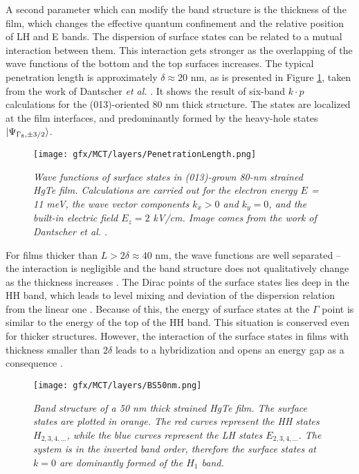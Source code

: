\documentclass[titlepage,a4paper]{book}
\begin{document}
A second parameter which can modify the band structure is the thickness of the film, which changes the effective quantum confinement and the relative position of LH and E bands. The dispersion of surface states can be related to a mutual interaction between them. This interaction gets stronger as the overlapping of the wave functions of the bottom and the top surfaces increases. The typical penetration length is approximately $\delta \approx 20$ nm, as is presented in Figure \ref{fig:PenetrationLength}, taken from the work of Dantscher \textit{et al.} \cite{Ganichev_MCT_layers}. It shows the result of six-band $k\cdot p$ calculations for the (013)-oriented 80 nm thick structure. The states are localized at the film interfaces, and predominantly formed by the heavy-hole states $\ket{\Psi_{\Gamma_8, \pm 3/2}}$. 
\begin{figure}[ht]
	\centering
	\texttt{[image: gfx/MCT/layers/PenetrationLength.png]}
	\vspace{-10pt}
	\caption{\textit{Wave functions of surface states in (013)-grown 80-nm strained HgTe film. Calculations are carried out for the electron energy $E$ = 11 meV, the wave vector components $k_x > 0$ and $k_y = 0$, and the built-in electric field $E_z = 2$ kV/cm. Image comes from the work of Dantscher \textit{et al.} \cite{Ganichev_MCT_layers}.}}
	\label{fig:PenetrationLength}
\end{figure} 

For films thicker than $L > 2\delta \approx 40$ nm, the wave functions are well separated -- the interaction is negligible and the band structure does not qualitatively change as the thickness increases \cite{Baum_MCT_layers}. The Dirac points of the surface states lies deep in the HH band, which leads to level mixing and deviation of the dispersion relation from the linear one \cite{Ganichev_MCT_layers}. Because of this, the energy of surface states at the $\Gamma$ point is similar to the energy of the top of the HH band. This situation is conserved even for thicker structures. However, the interaction of the surface states in films with thickness smaller than $2\delta$ leads to a hybridization and opens an energy gap as a consequence \cite{Baum_MCT_layers}. 

\begin{figure}[H]
	\centering
	\texttt{[image: gfx/MCT/layers/BS50nm.png]}
	\vspace{-10pt}
	\caption{\textit{Band structure of a 50 nm thick strained HgTe film. The surface states are plotted in orange. The red curves represent the HH states $H_{2,3,4,...}$, while the blue curves represent the LH states $E_{2,3,4,...}$. The system is in the inverted band order, therefore the surface states at $k = 0$ are dominantly formed of the $H_1$ band.}}
	\label{fig:BS50nm}
\end{figure} 
\end{document}
